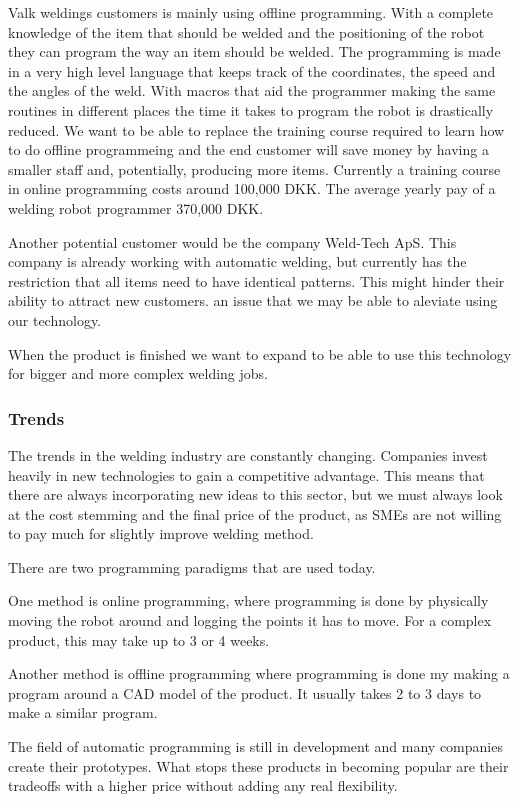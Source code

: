 Valk weldings customers is mainly using offline programming.
With a complete knowledge of the item that should be welded and the positioning of the robot they can program the way an item should be welded.
The programming is made in a very high level language that keeps track of the coordinates, the speed and the angles of the weld.
With macros that aid the programmer making the same routines in different places the time it takes to program the robot is drastically reduced.
We want to be able to replace the training course required to learn how to do offline programmeing and the end customer will save money by having a smaller staff and, potentially, producing more items. 
Currently a training course in online programming costs around 100,000 DKK\cite{valk_welding_summary}. 
The average yearly pay of a welding robot programmer 370,000 DKK\cite{welding_salary}. 

Another potential customer would be the company Weld-Tech ApS. 
This company is already working with automatic welding, but currently has the restriction that all items need to have identical patterns. 
This might hinder their ability to attract new customers. an issue that we may be able to aleviate using our technology.

When the product is finished we want to expand to be able to use this technology for bigger and more complex welding jobs.


\subsubsection{Trends}
The trends in the welding industry are constantly changing. 
Companies invest heavily in new technologies to gain a competitive advantage. 
This means that there are always incorporating new ideas to this sector, but we must always look at the cost stemming and the final price of the product, as SMEs are not willing to pay much for slightly improve welding method.

There are two programming paradigms that are used today.

One method is online programming, where programming is done by physically moving the robot around and logging the points it has to move. For a complex product, this may take up to 3 or 4 weeks.

Another method is offline programming where programming is done my making a program around a CAD model of the product.
It usually takes 2 to 3 days to make a similar program.

The field of automatic programming is still in development and many companies create their prototypes. 
What stops these products in becoming popular are their tradeoffs with a higher price without adding any real flexibility.
